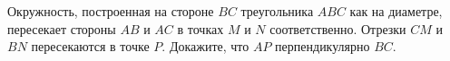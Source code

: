 \begin{ex}
	\begin{condition}
		Окружность, построенная на стороне \( BC \) треугольника \( ABC  \) как на диаметре, пересекает стороны \( AB  \) и \( AC  \) в	точках \( M  \) и \( N  \) соответственно. Отрезки \( CM  \) и \( BN  \) пересекаются в точке \( P  \). Докажите, что \( AP  \) перпендикулярно \( BC \).
	\end{condition}
\end{ex}